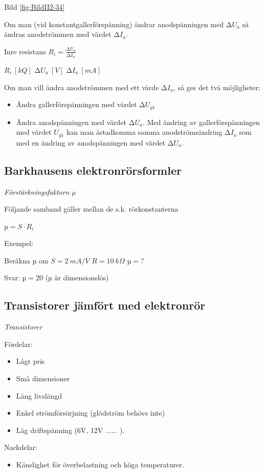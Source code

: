 Bild \ref{fig:BildII2-34}

Om man (vid konstantgallerförspänning) ändrar anodspänningen med
\(∆U_a\) så ändras anodströmmen med värdet \(∆I_a\).

Inre resistans \(R_i = \frac{∆U_a}{∆I_a}\)

\(R_i\ [kQ]\) \(∆U_a\ [V]\) \(∆I_a\ [mA]\)

Om man vill ändra anodströmmen med ett värde \(∆I_a\), så ges det två
möjligheter:
\begin{itemize}
\item Ändra gallerförspänningen med värdet \(∆U_{g1}\)
\item Ändra anodspänningen med värdet \(∆U_a\).
  Med ändring av gallerförspänningen med värdet \(U_{g1}\) kan man åstadkomma
  samma anodströmsändring \(∆I_a\) som med en ändring av anodspänningen med
  värdet \(∆U_a\).
\end{itemize}

\subsection{Barkhausens elektronrörsformler}

\emph{Förstärkningsfaktorn µ}

Följande samband gäller mellan de s.k. rörkonstanterna

\(µ = S \cdot R_i\)

Exempel:

Beräkna µ om \(S = 2\ mA/V\) \(R = 10\ kΩ\) \(µ = ?\)

Svar: \(µ = 20\) (µ är dimensionslös)

\subsection{Transistorer jämfört med elektronrör}

\emph{Transistorer}

Fördelar:
\begin{itemize}
\item Lågt pris
\item Små dimensioner
\item Lång livslängd
\item Enkel strömförsörjning (glödström behövs inte)
\item Låg driftspänning (6V, 12V ...... ).
\end{itemize}

Nackdelar:
\begin{itemize}
\item Känslighet för överbelastning och höga temperaturer.
\end{itemize}

